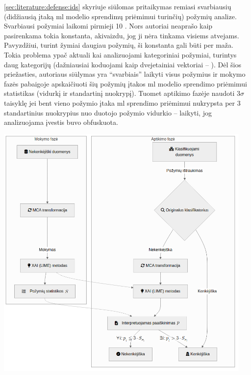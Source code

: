 \noindent
\begin{minipage}{0.45\textwidth}
    \hspace{1cm}
    \ref{sec:literature:defense:ids} skyriuje siūlomas \LIME pritaikymas remiasi svarbiausių (didžiausią įtaką \gls{ml} modelio sprendimų priėmimui turinčių) požymių analize. Svarbiausi požymiai laikomi pirmieji 10 \cite{tcydenovaDetectionAdversarialAttacks2021}. Nors autoriai neaprašo kaip pasirenkama tokia konstanta, akivaizdu, jog ji nėra tinkama visiems atvejams. Pavyzdžiui, turint žymiai daugiau požymių, ši konstanta gali būti per maža. Tokia problema ypač aktuali kai analizuojami kategoriniai požymiai, turintys daug kategorijų (dažniausiai koduojami kaip dvejetainiai vektoriai -- ). Dėl šios priežasties, autoriaus siūlymas yra \enquote{svarbiais} laikyti visus požymius ir mokymo fazės pabaigoje apskaičiuoti šių požymių įtakos \gls{ml} modelio sprendimo priėmimui statistikas (vidurkį ir standartinį nuokrypį). Tuomet aptikimo fazėje naudoti $3 \sigma$ taisyklę \cite{pukelsheimThreeSigmaRule1994} \ty jei bent vieno požymio įtaka \gls{ml} sprendimo priėmimui nukrypsta per 3 standartinius nuokrypius nuo duotojo požymio vidurkio -- laikyti, jog analizuojama įvestis buvo obfuskuota.
\end{minipage}
\hspace{0.02\textwidth}
\begin{minipage}{0.58\textwidth}
    \captionsetup{justification=centering}
    \includegraphics[width=0.95\textwidth]{images/original.png}
    \label{fig:original}
\end{minipage}

